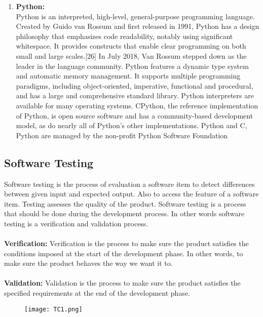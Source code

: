 \documentclass[10pt,a4paper]
{article}
\numberwithin{table}{section}
\begin{document}
{{\begin{normalsize}
\begin{enumerate}
\item \textbf{Python:}\\
\hspace*{0.3cm}Python is an interpreted, high-level, general-purpose programming language. Created by Guido van Rossum and first released in 1991, Python has a design philosophy that emphasizes code readability, notably using significant whitespace. It provides constructs that enable clear programming on both small and large scales.[26] In July 2018, Van Rossum stepped down as the leader in the language community. Python features a dynamic type system and automatic memory management. It supports multiple programming paradigms, including object-oriented, imperative, functional and procedural, and has a large and comprehensive standard library. Python interpreters are available for many operating systems. CPython, the reference implementation of Python, is open source software and has a community-based development model, as do nearly all of Python's other implementations. Python and C, Python are managed by the non-profit Python Software Foundation
\end{enumerate}
\newpage
\subsection{Software Testing}
\hspace*{0.3cm}Software testing is the process of evaluation a software item to detect differences between given input and expected output. Also to access the feature of a software item. Testing assesses the quality of the product. Software testing is a process that should be done during the development process. In other words software testing is a verification and validation process.\\
\\\textbf{Verification:}
Verification is the process to make sure the product satisfies the conditions imposed at the start of the development phase. In other words, to make sure the product behaves the way we want it to.\\
\\\textbf{Validation:}
Validation is the process to make sure the product satisfies the specified requirements at the end of the development phase.\\
  
\begin{center}
	  \begin{figure}[h]
			\centering
\texttt{[image: TC1.png]}
		\end{figure}
	\end{center}


\end{normalsize}}}
\end{document}
